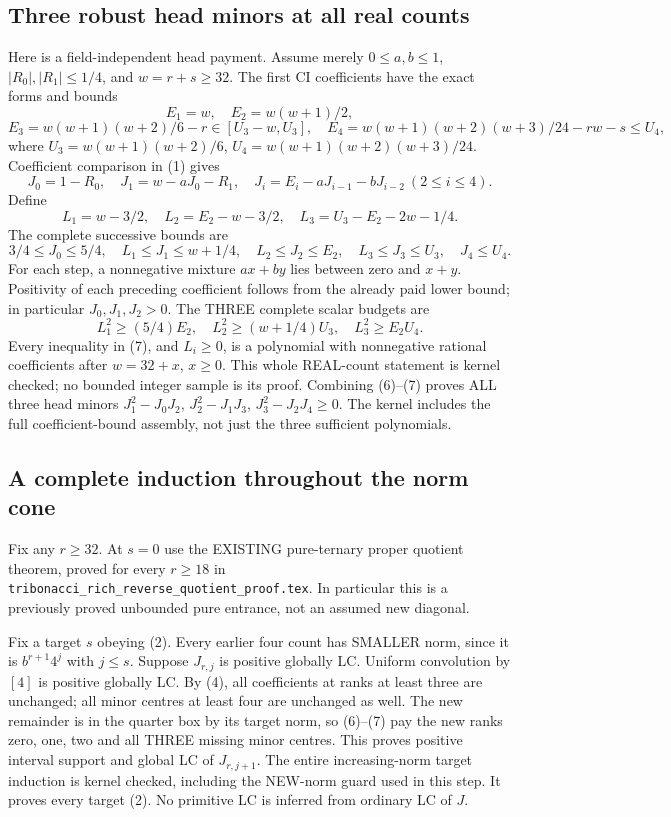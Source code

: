 \subsection{Three robust head minors at all real counts}
Here is a field-independent head payment. Assume merely
$0\le a,b\le1$, $|R_0|,|R_1|\le1/4$, and $w=r+s\ge32$.
The first CI coefficients have the exact forms and bounds
\[
 E_1=w,\quad E_2=w(w+1)/2,
\]
\[
 E_3=w(w+1)(w+2)/6-r\in[U_3-w,U_3],\quad
 E_4=w(w+1)(w+2)(w+3)/24-rw-s\le U_4,
\]
where $U_3=w(w+1)(w+2)/6$, $U_4=w(w+1)(w+2)(w+3)/24$.
Coefficient comparison in (1) gives
\[
 J_0=1-R_0,\quad J_1=w-aJ_0-R_1,\quad
 J_i=E_i-aJ_{i-1}-bJ_{i-2}\ (2\le i\le4).
\]
Define
\[
 L_1=w-3/2,\quad L_2=E_2-w-3/2,\quad
 L_3=U_3-E_2-2w-1/4.
\]
The complete successive bounds are
\[
 3/4\le J_0\le5/4,\quad L_1\le J_1\le w+1/4,
 \quad L_2\le J_2\le E_2,
 \quad L_3\le J_3\le U_3,\quad J_4\le U_4.                \tag{6}
\]
For each step, a nonnegative mixture $ax+by$ lies between zero and
$x+y$. Positivity of each preceding coefficient follows from the
already paid lower bound; in particular $J_0,J_1,J_2>0$.
The THREE complete scalar budgets are
\[
 L_1^2\ge(5/4)E_2,\quad
 L_2^2\ge(w+1/4)U_3,\quad
 L_3^2\ge E_2U_4.                                      \tag{7}
\]
Every inequality in (7), and $L_i\ge0$, is a polynomial with
nonnegative rational coefficients after $w=32+x$, $x\ge0$.
This whole REAL-count statement is kernel checked; no bounded integer
sample is its proof. Combining (6)--(7) proves ALL three head minors
$J_1^2-J_0J_2$, $J_2^2-J_1J_3$, $J_3^2-J_2J_4\ge0$.
The kernel includes the full coefficient-bound assembly, not just
the three sufficient polynomials.

\subsection{A complete induction throughout the norm cone}
Fix any $r\ge32$. At $s=0$ use the EXISTING pure-ternary proper
quotient theorem, proved for every $r\ge18$ in
\texttt{tribonacci\_rich\_reverse\_quotient\_proof.tex}.
In particular this is a previously proved unbounded pure entrance,
not an assumed new diagonal.

Fix a target $s$ obeying (2). Every earlier four count has SMALLER
norm, since it is $b^{r+1}4^j$ with $j\le s$. Suppose $J_{r,j}$
is positive globally LC. Uniform convolution by $[4]$ is positive
globally LC. By (4), all coefficients at ranks at least three are
unchanged; all minor centres at least four are unchanged as well.
The new remainder is in the quarter box by its target norm, so
(6)--(7) pay the new ranks zero, one, two and all THREE missing
minor centres. This proves positive interval support and global LC
of $J_{r,j+1}$. The entire increasing-norm target induction is
kernel checked, including the NEW-norm guard used in this step.
It proves every target (2). No primitive LC is inferred from ordinary
LC of $J$.

